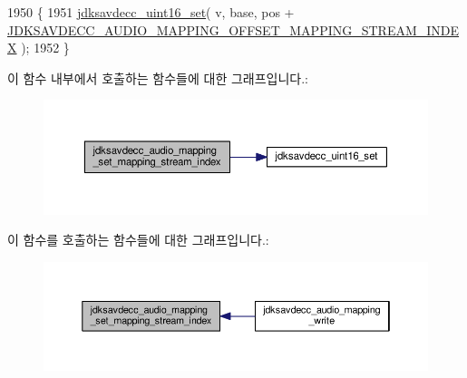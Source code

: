 \begin{DoxyCode}
1950 \{
1951     \hyperlink{group__endian_ga14b9eeadc05f94334096c127c955a60b}{jdksavdecc\_uint16\_set}( v, base, pos + 
      \hyperlink{group__audio__mapping_gaff17abcbae620dedc2c0f683b6148b8f}{JDKSAVDECC\_AUDIO\_MAPPING\_OFFSET\_MAPPING\_STREAM\_INDEX} );
1952 \}
\end{DoxyCode}


이 함수 내부에서 호출하는 함수들에 대한 그래프입니다.\+:
\nopagebreak
\begin{figure}[H]
\begin{center}
\leavevmode
\includegraphics[width=350pt]{group__audio__mapping_ga19d7ad962d8f4da0ebb861cf3dcac0e1_cgraph}
\end{center}
\end{figure}




이 함수를 호출하는 함수들에 대한 그래프입니다.\+:
\nopagebreak
\begin{figure}[H]
\begin{center}
\leavevmode
\includegraphics[width=350pt]{group__audio__mapping_ga19d7ad962d8f4da0ebb861cf3dcac0e1_icgraph}
\end{center}
\end{figure}


